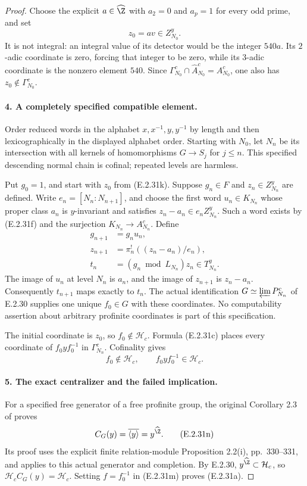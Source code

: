 \begin{proof}
Choose the explicit \(a\in\widehat\Z\) with
\(a_2=0\) and \(a_p=1\) for every odd prime, and set
\[
 z_0=av\in Z_{N_0}^y.
\tag{E.2.31k}
\]
It is not integral: an integral value of its detector
would be the integer \(540a\). Its \(2\)-adic coordinate
is zero, forcing that integer to be zero, while its
\(3\)-adic coordinate is the nonzero element \(540\).
Since \(\Gamma_{N_0}^c\cap\widehat A_{N_0}^c=A_{N_0}^c\),
one also has \(z_0\notin\Gamma_{N_0}^c\).

\paragraph{4. A completely specified compatible element.}
Order reduced words in the alphabet
\(x,x^{-1},y,y^{-1}\) by length and then lexicographically
in the displayed alphabet order. Starting with \(N_0\),
let \(N_n\) be its intersection with all kernels of
homomorphisms \(G\to S_j\) for \(j\leq n\). This
specified descending normal chain is cofinal; repeated
levels are harmless.

Put \(g_0=1\), and start with \(z_0\) from (E.2.31k).
Suppose \(g_n\in F\) and \(z_n\in Z_{N_n}^y\) are
defined. Write \(e_n=[N_n:N_{n+1}]\), and choose the
first word \(u_n\in K_{N_n}\) whose proper class
\(a_n\) is \(y\)-invariant and satisfies
\(z_n-a_n\in e_n Z_{N_n}^y\). Such a word exists by
(E.2.31f) and the surjection
\(K_{N_n}\to A_{N_n}^c\). Define
\[
 \begin{aligned}
 g_{n+1}&=g_nu_n,\\
 z_{n+1}&=\pi_n^!((z_n-a_n)/e_n),\\
 t_n&=(g_n\bmod L_{N_n})z_n\in T_{N_n}^y.
 \end{aligned}
\tag{E.2.31l}
\]
The image of \(u_n\) at level \(N_n\) is \(a_n\),
and the image of \(z_{n+1}\) is \(z_n-a_n\).
Consequently \(t_{n+1}\) maps exactly to \(t_n\).
The actual identification
\(G\simeq\varprojlim P_{N_n}^c\) of E.2.30 supplies
one unique \(f_0\in G\) with these coordinates.
No computability assertion about arbitrary profinite
coordinates is part of this specification.

The initial coordinate is \(z_0\), so
\(f_0\notin\mathcal H_c\). Formula (E.2.31c)
places every coordinate of \(f_0yf_0^{-1}\) in
\(\Gamma_{N_n}^c\). Cofinality gives
\[
 f_0\notin\mathcal H_c,
 \qquad f_0yf_0^{-1}\in\mathcal H_c.
\tag{E.2.31m}
\]

\paragraph{5. The exact centralizer and the failed implication.}
For a specified free generator of a free profinite group,
the original Corollary 2.3 of
\cite[p.~332]{GenBuxErshovRapinchuk2011} proves
\[
 C_G(y)=\overline{\langle y\rangle}=y^{\widehat\Z}.
\tag{E.2.31n}
\]
Its proof uses the explicit finite relation-module
Proposition 2.2(i), pp.~330--331, and applies to this
actual generator and completion. By E.2.30,
\(y^{\widehat\Z}\subset\mathcal H_c\), so
\(\mathcal H_c C_G(y)=\mathcal H_c\).
Setting \(f=f_0^{-1}\) in (E.2.31m) proves (E.2.31a).


\end{proof}
